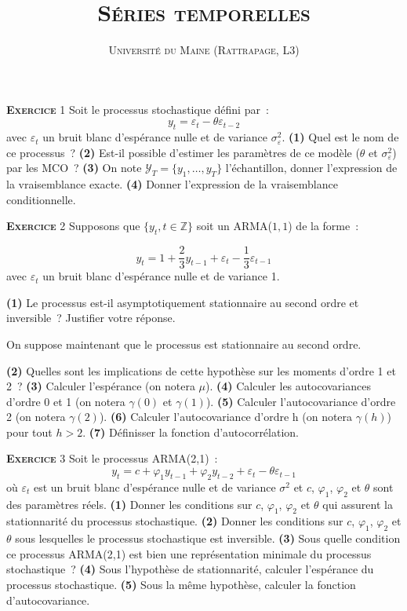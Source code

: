 \documentclass[10pt,a4paper,notitlepage,twocolumn]{article}
\newcommand{\exercice}[1]{\textsc{\textbf{Exercice}} #1}
\newcommand{\question}[1]{\textbf{(#1)}}
\begin{document}
\title{\textsc{Séries temporelles}}
\author{\textsc{Université du Maine (Rattrapage, L3)}}
\date{}

\maketitle

\exercice{1} Soit le processus stochastique défini par :
\[
  y_t = \varepsilon_t - \theta \varepsilon_{t-2}
\]
avec $\varepsilon_t$ un bruit blanc d'espérance nulle et de variance
$\sigma_{\varepsilon}^2$. \textbf{(1)} Quel est le nom de ce
processus ? \textbf{(2)} Est-il possible d'estimer les paramètres de
ce modèle ($\theta$ et $\sigma_{\varepsilon}^2$) par les MCO ?
\textbf{(3)} On note $\mathcal Y_T = \{y_1,\dots,y_T\}$ l'échantillon,
donner l'expression de la vraisemblance exacte. \textbf{(4)} Donner
l'expression de la vraisemblance conditionnelle.

\bigskip
\bigskip

\exercice{2} Supposons que $\{y_t,t\in\mathbb Z\}$ soit un ARMA($1,1$) de la forme :

\[
y_t = 1 + \frac{2}{3}y_{t-1} + \varepsilon_t - \frac{1}{3} \varepsilon_{t-1}
\]
avec $\varepsilon_t$ un bruit blanc d'espérance nulle et de variance 1.\newline

\question{1}   Le    processus   est-il   asymptotiquement
stationnaire  au   second  ordre   et  inversible~?   Justifier  votre
réponse.\newline

On suppose maintenant que le processus est stationnaire au second
ordre.\newline

\question{2} Quelles sont les implications de cette hypothèse sur les
moments d'ordre 1 et 2 ? \question{3} Calculer l'espérance (on notera
$\mu$). \question{4} Calculer les autocovariances d'ordre
0 et 1 (on notera $\gamma(0)$ et $\gamma(1)$). \question{5} Calculer
l'autocovariance d'ordre 2 (on notera $\gamma(2)$). \question{6}
Calculer l'autocovariance d'ordre h (on notera $\gamma(h)$) pour tout
$h>2$.  \question{7} Définisser la fonction d'autocorrélation.

\bigskip
\bigskip

\exercice{3} Soit le processus ARMA(2,1) :
\[
y_t = c + \varphi_1 y_{t-1} + \varphi_2 y_{t-2} + \varepsilon_t - \theta \varepsilon_{t-1}
\]
où $\varepsilon_t$ est un bruit blanc d'espérance nulle et de variance
$\sigma^2$ et $c$, $\varphi_1$, $\varphi_2$ et $\theta$ sont des
paramètres réels. \textbf{(1)} Donner les conditions sur $c$,
$\varphi_1$, $\varphi_2$ et $\theta$ qui assurent la stationnarité du
processus stochastique. \textbf{(2)} Donner les conditions sur $c$,
$\varphi_1$, $\varphi_2$ et $\theta$ sous lesquelles le processus
stochastique est inversible. \textbf{(3)} Sous quelle condition ce
processus ARMA(2,1) est bien une représentation minimale du processus
stochastique ? \textbf{(4)} Sous l'hypothèse de stationnarité,
calculer l'espérance du processus stochastique. \textbf{(5)} Sous la
même hypothèse, calculer la fonction d'autocovariance.
\end{document}
